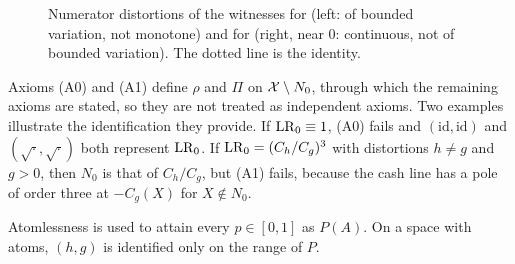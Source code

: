 \begin{figure}[ht]
\centering
{}
\caption{Numerator distortions of the witnesses for \axRM{} (left: of bounded variation, not monotone) and for
\axRC{} (right, near $0$: continuous, not of bounded variation). The dotted line is the identity.}\label{fig:witness}
\end{figure}



Axioms (A0) and (A1) define $\rho$ and $\Pi$ on $\mathcal X\setminus N_0$, through which the remaining axioms are stated, so they
are not treated as independent axioms. Two examples illustrate the identification they provide. If $\mathrm{LR}_0\equiv1$,
(A0) fails and $(\mathrm{id},\mathrm{id})$ and $(\sqrt\cdot,\sqrt\cdot)$ both represent $\mathrm{LR}_0$. If $\mathrm{LR}_0=(C_h/C_g)^3$ with
distortions $h\ne g$ and $g>0$, then $N_0$ is that of $C_h/C_g$, but (A1) fails, because the cash line has a pole of
order three at $-C_g(X)$ for $X\notin N_0$.

\begin{remark}[Atomlessness]
Atomlessness is used to attain every $p\in[0,1]$ as $P(A)$. On a space with atoms, $(h,g)$ is identified only
on the range of $P$.
\end{remark}

